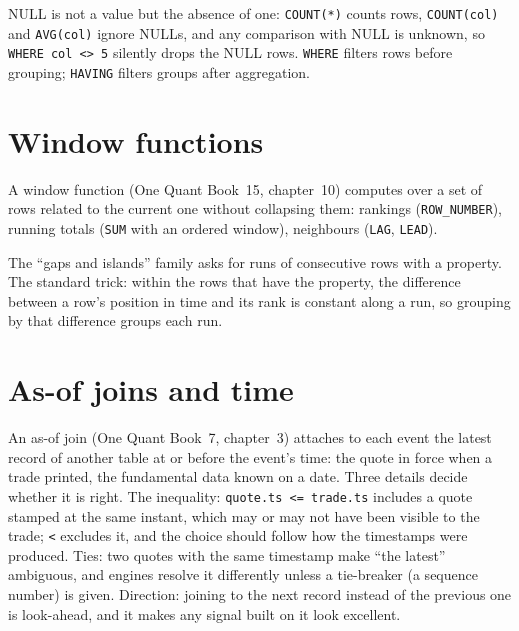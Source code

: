 NULL is not a value but the absence of one: \texttt{COUNT(*)} counts rows, \texttt{COUNT(col)} and \texttt{AVG(col)} ignore NULLs, and
any comparison with NULL is unknown, so \texttt{WHERE col <> 5} silently drops the NULL rows. \texttt{WHERE} filters rows before
grouping; \texttt{HAVING} filters groups after aggregation.

\section{Window functions}

A window function (One Quant Book~15, chapter~10) computes over a set of rows related to the current one without collapsing them:
rankings (\texttt{ROW\_NUMBER}), running totals (\texttt{SUM} with an ordered window), neighbours (\texttt{LAG}, \texttt{LEAD}).

\label{lst:iv:sql-and-data:dd}

The ``gaps and islands'' family asks for runs of consecutive rows with a property. The standard trick: within the rows that
have the property, the difference between a row's position in time and its rank is constant along a run, so grouping by that
difference groups each run.

\label{lst:iv:sql-and-data:islands}

\section{As-of joins and time}

An as-of join (One Quant Book~7, chapter~3) attaches to each event the latest record of another table at or before the event's
time: the quote in force when a trade printed, the fundamental data known on a date. Three details decide whether it is right.
The inequality: \texttt{quote.ts <= trade.ts} includes a quote stamped at the same instant, which may or may not have been visible to
the trade; \texttt{<} excludes it, and the choice should follow how the timestamps were produced. Ties: two quotes with the same
timestamp make ``the latest'' ambiguous, and engines resolve it differently unless a tie-breaker (a sequence number) is given.
Direction: joining to the next record instead of the previous one is look-ahead, and it makes any signal built on it look
excellent.

